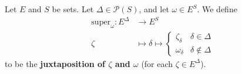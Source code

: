 \begin{definition}[Juxtaposition]
    \label{def:juxtaposition}
    \leanok

    Let $E$ and $S$ be sets. Let $\Delta\in\mathcal{P}(S)$, and let $\omega\in E^S$. We define
    \begin{align}
        \text{super}_\omega:E^\Delta&\to E^S\\
        \zeta&\mapsto \delta\mapsto\begin{cases}
            \zeta_\delta & \delta\in\Delta\\
            \omega_\delta & \delta\notin\Delta
        \end{cases}
    \end{align}
    to be the \textbf{juxtaposition of $\zeta$ and $\omega$} (for each $\zeta\in E^\Delta$).
\end{definition}
